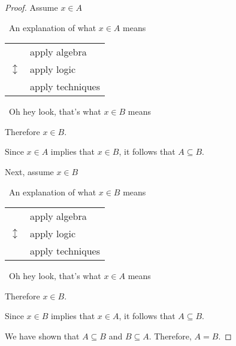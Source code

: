 \documentclass{amsart} %
\theoremstyle{definition} %
\theoremstyle{definition}
\theoremstyle{remark} %
\begin{document}
\begin{proof}
      Assume $x \in A$

            \begin{center}
                  \guillemotleft\ An explanation of what $ x \in A$ means \guillemotright
            \end{center}

            \begin{center}
            \begin{tabular}{r l}
                  \multirow{3}{*}{\huge $\updownarrow$} & apply algebra \\
                  & apply logic \\
                  & apply techniques \\
            \end{tabular}
            \end{center}

            \begin{center}
                  \guillemotleft\ Oh hey look, that's what $x \in B$ means \guillemotright
            \end{center}

            Therefore $x \in B$.

            Since $x \in A$ implies that $x \in B$, it follows that $A \subseteq B$.

            \bigskip

            Next, assume $x \in B$

            \begin{center}
                  \guillemotleft\ An explanation of what $ x \in B$ means \guillemotright
            \end{center}

            \begin{center}
            \begin{tabular}{r l}
                  \multirow{3}{*}{\huge $\updownarrow$} & apply algebra \\
                  & apply logic \\
                  & apply techniques \\
            \end{tabular}
            \end{center}

            \begin{center}
                  \guillemotleft\ Oh hey look, that's what $x \in A$ means \guillemotright
            \end{center}

            Therefore $x \in B$.

            Since $x \in B$ implies that $x \in A$, it follows that $A \subseteq B$.


            We have shown that $A \subseteq B$ and $B \subseteq A$. Therefore, $A = B$.

\end{proof}
\end{document}
